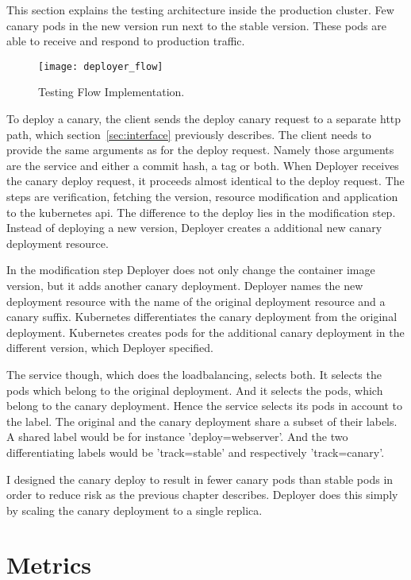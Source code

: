This section explains the testing architecture inside the production cluster. Few canary
pods in the new version run next to the stable version. These pods are able to receive and
respond to production traffic.

\begin{figure}[htbp] \centering \texttt{[image: deployer\_flow]}
  \caption[nprtflow]{Testing Flow Implementation.}
  \label{fig:testing_flow}
\end{figure}


To deploy a canary, the client sends the deploy canary request to a separate http path,
which section~\ref{sec:interface} previously describes. The client needs to provide the
same arguments as for the deploy request. Namely those arguments are the service and
either a commit hash, a tag or both. When Deployer receives the canary deploy request, it
proceeds almost identical to the deploy request. The steps are verification, fetching the
version, resource modification and application to the kubernetes api. The difference to
the deploy lies in the modification step. Instead of deploying a new version, Deployer
creates a additional new canary deployment resource.

In the modification step Deployer does not only change the container image version, but it
adds another canary deployment. Deployer names the new deployment resource with the name
of the original deployment resource and a canary suffix. Kubernetes differentiates the
canary deployment from the original deployment. Kubernetes creates pods for the additional
canary deployment in the different version, which Deployer specified.

The service though, which does the loadbalancing, selects both. It selects the pods which
belong to the original deployment. And it selects the pods, which belong to the canary
deployment. Hence the service selects its pods in account to the label. The original and
the canary deployment share a subset of their labels. A shared label would be for instance
'deploy=webserver'. And the two differentiating labels would be 'track=stable' and
respectively 'track=canary'.

I designed the canary deploy to result in fewer canary pods than stable pods in order to
reduce risk as the previous chapter describes. Deployer does this simply by scaling the
canary deployment to a single replica.

\section{Metrics}

